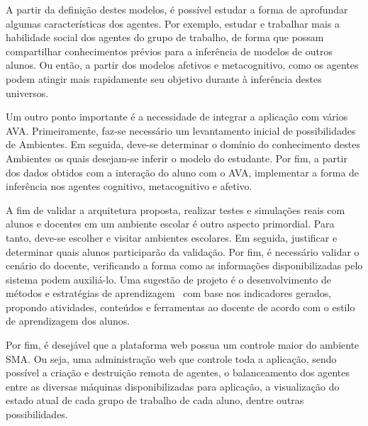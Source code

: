 A partir da definição destes modelos, é possível estudar a forma de aprofundar algumas características dos agentes. Por exemplo, estudar e trabalhar mais a habilidade social dos agentes do grupo de trabalho, de forma que possam compartilhar conhecimentos prévios para a inferência de modelos de outros alunos. Ou então, a partir dos modelos afetivos e metacognitivo, como os agentes podem atingir mais rapidamente seu objetivo durante à inferência destes universos.

Um outro ponto importante é a necessidade de integrar a aplicação com vários AVA. Primeiramente, faz-se necessário um levantamento inicial de possibilidades de Ambientes. Em seguida, deve-se determinar o domínio do conhecimento destes Ambientes os quais desejam-se inferir o modelo do estudante. Por fim, a partir dos dados obtidos com a interação do aluno com o AVA, implementar a forma de inferência nos agentes cognitivo, metacognitivo e afetivo.

A fim de validar a arquitetura proposta, realizar testes e simulações reais com alunos e docentes em um ambiente escolar é outro aspecto primordial. Para tanto, deve-se escolher e visitar ambientes escolares. Em seguida, justificar e determinar quais alunos participarão da validação. Por fim, é necessário validar o cenário do docente, verificando a forma como as informações disponibilizadas pelo sistema podem auxiliá-lo. Uma sugestão de projeto é o desenvolvimento de métodos e estratégias de aprendizagem~\cite{muhlbeier12} com base nos indicadores gerados, propondo atividades, conteúdos e ferramentas ao docente de acordo com o estilo de aprendizagem dos alunos.

Por fim, é desejável que a plataforma web possua um controle maior do ambiente SMA. Ou seja, uma administração web que controle toda a aplicação, sendo possível a criação e destruição remota de agentes, o balanceamento dos agentes entre as diversas máquinas disponibilizadas para aplicação, a visualização do estado atual de cada grupo de trabalho de cada aluno, dentre outras possibilidades.
